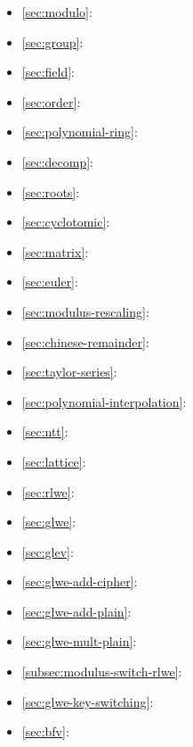 \begin{tcolorbox}
\begin{itemize}
\item \autoref{sec:modulo}: 
\item \autoref{sec:group}: 
\item \autoref{sec:field}: 
\item \autoref{sec:order}: 
\item \autoref{sec:polynomial-ring}: 
\item \autoref{sec:decomp}: 
\item \autoref{sec:roots}: 
\item \autoref{sec:cyclotomic}: 
\item \autoref{sec:matrix}: 
\item \autoref{sec:euler}: 
\item \autoref{sec:modulus-rescaling}: 
\item \autoref{sec:chinese-remainder}: 
\item \autoref{sec:taylor-series}: 
\item \autoref{sec:polynomial-interpolation}: 
\item \autoref{sec:ntt}: 
\item \autoref{sec:lattice}: 
\item \autoref{sec:rlwe}: 
\item \autoref{sec:glwe}: 
\item \autoref{sec:glev}: 
\item \autoref{sec:glwe-add-cipher}: 
\item \autoref{sec:glwe-add-plain}: 
\item \autoref{sec:glwe-mult-plain}: 
\item \autoref{subsec:modulus-switch-rlwe}: 
\item \autoref{sec:glwe-key-switching}: 
\item \autoref{sec:bfv}: 
\end{itemize}
\end{tcolorbox}

